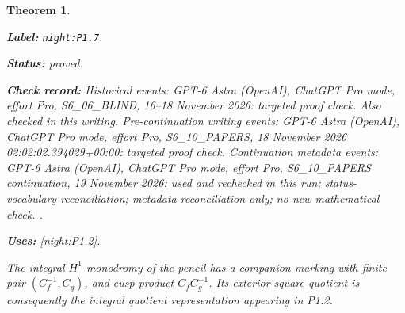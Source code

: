 \documentclass[11pt,a4paper]{article}
\newtheorem{theorem}{Theorem}[section]
\theoremstyle{definition}
\newcommand{\StatementRecord}[4]{\par\smallskip\begingroup\upshape\raggedright\noindent\textbf{Label:} \nolinkurl{#1}.\par\noindent\textbf{Status:} #2.\par\noindent\textbf{Check record:} #3.\par\noindent\textbf{Uses:} #4.\par\endgroup\smallskip}
\begin{document}
\begin{theorem}\label{night:P1.7}
\StatementRecord{night:P1.7}{proved}{Historical events: GPT-6 Astra (OpenAI), ChatGPT Pro mode, effort Pro, S6\_06\_BLIND, 16--18 November 2026: targeted proof check. Also checked in this writing. Pre-continuation writing events: GPT-6 Astra (OpenAI), ChatGPT Pro mode, effort Pro, S6\_10\_PAPERS, 18 November 2026 02:02:02.394029+00:00: targeted proof check. Continuation metadata events: GPT-6 Astra (OpenAI), ChatGPT Pro mode, effort Pro, S6\_10\_PAPERS continuation, 19 November 2026: used and rechecked in this run; status-vocabulary reconciliation; metadata reconciliation only; no new mathematical check. }{\cref{night:P1.2}}
The integral $H^1$ monodromy of the pencil has a companion marking with
finite pair $(C_f^{-1},C_g)$, and cusp product $C_fC_g^{-1}$.
Its exterior-square quotient is consequently the integral quotient
representation appearing in P1.2.
\end{theorem}
\end{document}
